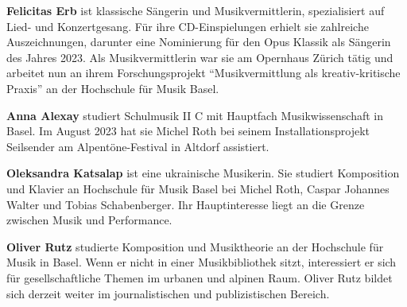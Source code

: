 \documentclass[a4paper,
fontsize=11pt,
oneside,
numbers=noperiodatend,
parskip=half-,
bibliography=totoc,
final
]{scrartcl}
\begin{document}
\textbf{Felicitas Erb} ist klassische Sängerin und Musikvermittlerin,
spezialisiert auf Lied- und Konzertgesang. Für ihre CD-Einspielungen
erhielt sie zahlreiche Auszeichnungen, darunter eine Nominierung für den
Opus Klassik als Sängerin des Jahres 2023. Als Musikvermittlerin war sie
am Opernhaus Zürich tätig und arbeitet nun an ihrem Forschungsprojekt
``Musikvermittlung als kreativ-kritische Praxis'' an der Hochschule für
Musik Basel.

\textbf{Anna Alexay} studiert Schulmusik II C mit Hauptfach
Musikwissenschaft in Basel. Im August 2023 hat sie Michel Roth bei
seinem Installationsprojekt Seilsender am Alpentöne-Festival in Altdorf
assistiert.

\textbf{Oleksandra Katsalap} ist eine ukrainische Musikerin. Sie
studiert Komposition und Klavier an Hochschule für Musik Basel bei
Michel Roth, Caspar Johannes Walter und Tobias Schabenberger. Ihr
Hauptinteresse liegt an die Grenze zwischen Musik und Performance.

\textbf{Oliver Rutz} studierte Komposition und Musiktheorie an der
Hochschule für Musik in Basel. Wenn er nicht in einer Musikbibliothek
sitzt, interessiert er sich für gesellschaftliche Themen im urbanen und
alpinen Raum. Oliver Rutz bildet sich derzeit weiter im journalistischen
und publizistischen Bereich.
\end{document}
